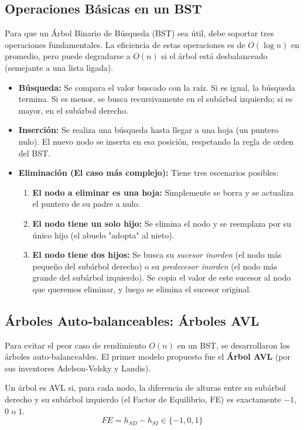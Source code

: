 \documentclass{article}
\begin{document}
	\subsection{Operaciones Básicas en un BST}
	Para que un Árbol Binario de Búsqueda (BST) sea útil, debe soportar tres operaciones fundamentales. La eficiencia de estas operaciones es de $O(\log n)$ en promedio, pero puede degradarse a $O(n)$ si el árbol está desbalanceado (semejante a una lista ligada).
	
	\begin{itemize}
		\item \textbf{Búsqueda:} Se compara el valor buscado con la raíz. Si es igual, la búsqueda termina. Si es menor, se busca recursivamente en el subárbol izquierdo; si es mayor, en el subárbol derecho.
		\item \textbf{Inserción:} Se realiza una búsqueda hasta llegar a una hoja (un puntero nulo). El nuevo nodo se inserta en esa posición, respetando la regla de orden del BST.
		\item \textbf{Eliminación (El caso más complejo):} Tiene tres escenarios posibles:
		\begin{enumerate}
			\item \textbf{El nodo a eliminar es una hoja:} Simplemente se borra y se actualiza el puntero de su padre a nulo.
			\item \textbf{El nodo tiene un solo hijo:} Se elimina el nodo y se reemplaza por su único hijo (el abuelo "adopta" al nieto).
			\item \textbf{El nodo tiene dos hijos:} Se busca su \textit{sucesor inorden} (el nodo más pequeño del subárbol derecho) o su \textit{predecesor inorden} (el nodo más grande del subárbol izquierdo). Se copia el valor de este sucesor al nodo que queremos eliminar, y luego se elimina el sucesor original.
		\end{enumerate}
	\end{itemize}
	
	\subsection{Árboles Auto-balanceables: Árboles AVL}
	Para evitar el peor caso de rendimiento $O(n)$ en un BST, se desarrollaron los árboles auto-balanceables. El primer modelo propuesto fue el \textbf{Árbol AVL} (por sus inventores Adelson-Velsky y Landis).
	
	Un árbol es AVL si, para cada nodo, la diferencia de alturas entre su subárbol derecho y su subárbol izquierdo (el Factor de Equilibrio, FE) es exactamente $-1$, $0$ o $1$.
	$$FE = h_{SD} - h_{SI} \in \{-1, 0, 1\}$$
	
\end{document}
